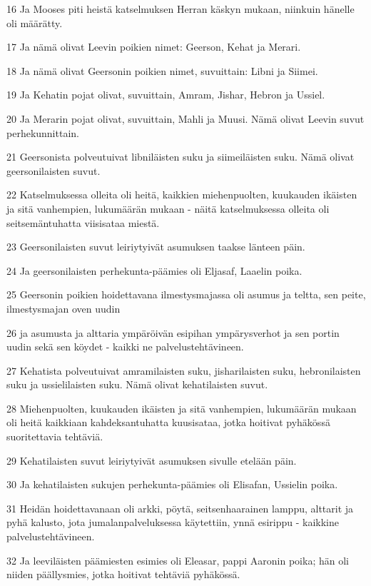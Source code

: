 \par 16 Ja Mooses piti heistä katselmuksen Herran käskyn mukaan, niinkuin hänelle oli määrätty.
\par 17 Ja nämä olivat Leevin poikien nimet: Geerson, Kehat ja Merari.
\par 18 Ja nämä olivat Geersonin poikien nimet, suvuittain: Libni ja Siimei.
\par 19 Ja Kehatin pojat olivat, suvuittain, Amram, Jishar, Hebron ja Ussiel.
\par 20 Ja Merarin pojat olivat, suvuittain, Mahli ja Muusi. Nämä olivat Leevin suvut perhekunnittain.
\par 21 Geersonista polveutuivat libniläisten suku ja siimeiläisten suku. Nämä olivat geersonilaisten suvut.
\par 22 Katselmuksessa olleita oli heitä, kaikkien miehenpuolten, kuukauden ikäisten ja sitä vanhempien, lukumäärän mukaan - näitä katselmuksessa olleita oli seitsemäntuhatta viisisataa miestä.
\par 23 Geersonilaisten suvut leiriytyivät asumuksen taakse länteen päin.
\par 24 Ja geersonilaisten perhekunta-päämies oli Eljasaf, Laaelin poika.
\par 25 Geersonin poikien hoidettavana ilmestysmajassa oli asumus ja teltta, sen peite, ilmestysmajan oven uudin
\par 26 ja asumusta ja alttaria ympäröivän esipihan ympärysverhot ja sen portin uudin sekä sen köydet - kaikki ne palvelustehtävineen.
\par 27 Kehatista polveutuivat amramilaisten suku, jisharilaisten suku, hebronilaisten suku ja ussielilaisten suku. Nämä olivat kehatilaisten suvut.
\par 28 Miehenpuolten, kuukauden ikäisten ja sitä vanhempien, lukumäärän mukaan oli heitä kaikkiaan kahdeksantuhatta kuusisataa, jotka hoitivat pyhäkössä suoritettavia tehtäviä.
\par 29 Kehatilaisten suvut leiriytyivät asumuksen sivulle etelään päin.
\par 30 Ja kehatilaisten sukujen perhekunta-päämies oli Elisafan, Ussielin poika.
\par 31 Heidän hoidettavanaan oli arkki, pöytä, seitsenhaarainen lamppu, alttarit ja pyhä kalusto, jota jumalanpalveluksessa käytettiin, ynnä esirippu - kaikkine palvelustehtävineen.
\par 32 Ja leeviläisten päämiesten esimies oli Eleasar, pappi Aaronin poika; hän oli niiden päällysmies, jotka hoitivat tehtäviä pyhäkössä.

